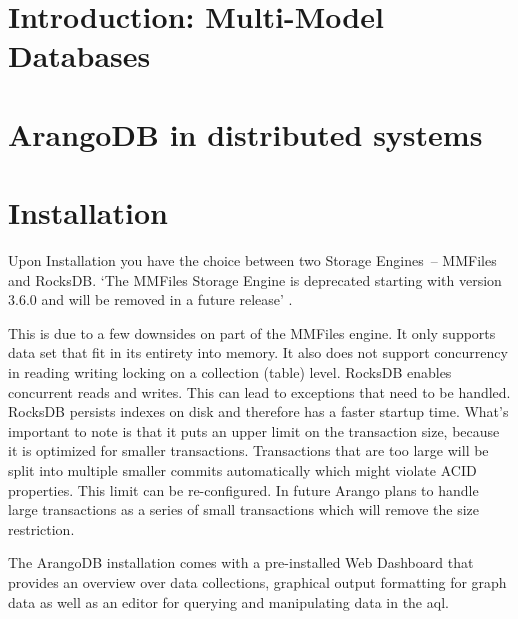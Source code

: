 
\section{Introduction: Multi-Model Databases}

\section{ArangoDB in distributed systems}

\section{Installation}

Upon Installation you have the choice between two Storage Engines – MMFiles and RocksDB. `The MMFiles Storage Engine is deprecated starting with version 3.6.0 and will be removed in a future release' \cite{ArangoDeprecated}.

This is due to a few downsides on part of the MMFiles engine. It only supports data set that fit in its entirety into memory. It also does not support concurrency in reading writing locking on a collection (table) level. RocksDB enables concurrent reads and writes. This can lead to exceptions that need to be handled. RocksDB persists indexes on disk and therefore has a faster startup time. What's important to note is that it puts an upper limit on the transaction size, because it is optimized
for smaller transactions. Transactions that are too large will be split into multiple smaller commits automatically which might violate ACID properties. This limit can be re-configured. In future Arango plans to handle large transactions as a series of small transactions which will remove the size restriction. \cite{MMvsRocks}

The ArangoDB installation comes with a pre-installed Web Dashboard that provides an overview over data collections, graphical output formatting for graph data as well as an editor for querying and manipulating data in the \gls{aql}.
